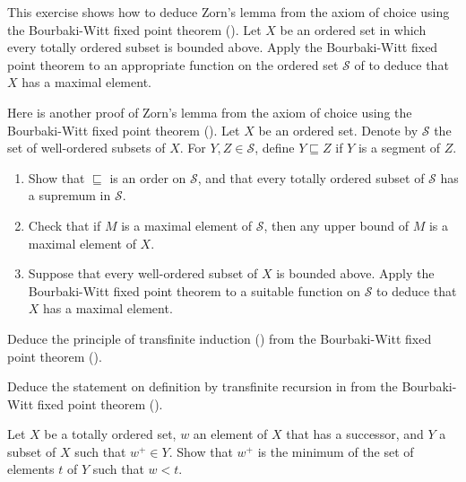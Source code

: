 \documentclass{article}
\begin{document}
\begin{exercise}
  \label{exe:h4ww3mr2}
  This exercise shows how to deduce Zorn's lemma from the axiom of
  choice using the Bourbaki-Witt fixed point theorem
  ().  Let \(X\) be an ordered set in which every
  totally ordered subset is bounded above.  Apply the Bourbaki-Witt
  fixed point theorem to an appropriate function on the ordered set
  \(\mathcal{S}\) of  to deduce that \(X\) has a
  maximal element.
\end{exercise}

\begin{exercise}
  \label{exe:51daga9q}
  Here is another proof of Zorn's lemma from the axiom of choice using
  the Bourbaki-Witt fixed point theorem ().  Let
  \(X\) be an ordered set.  Denote by \(\mathcal{S}\) the set of
  well-ordered subsets of \(X\).  For \(Y, Z \in \mathcal{S}\), define
  \(Y \sqsubseteq Z\) if \(Y\) is a segment of \(Z\).
  \begin{enumerate}
  \item \label{item:j6hjwyxg} Show that \(\sqsubseteq\) is an order on
    \(\mathcal{S}\), and that every totally ordered subset of
    \(\mathcal{S}\) has a supremum in \(\mathcal{S}\).
  \item \label{item:41f56yw7} Check that if \(M\) is a maximal element
    of \(\mathcal{S}\), then any upper bound of \(M\) is a maximal
    element of \(X\).
  \item Suppose that every well-ordered subset of \(X\) is bounded
    above.  Apply the Bourbaki-Witt fixed point theorem to a suitable
    function on \(\mathcal{S}\) to deduce that \(X\) has a maximal
    element.
  \end{enumerate}
\end{exercise}

\begin{exercise}
  \label{exe:y5zl49rq}
  Deduce the principle of transfinite induction ()
  from the Bourbaki-Witt fixed point theorem ().
\end{exercise}

\begin{exercise}
  \label{exe:ouafuvlu}
  Deduce the statement on definition by transfinite recursion in
   from the Bourbaki-Witt fixed point theorem
  ().
\end{exercise}

\begin{exercise}
  \label{exe:ylp1zcc8}
  Let \(X\) be a totally ordered set, \(w\) an element of \(X\) that
  has a successor, and \(Y\) a subset of \(X\) such that
  \(w^+ \in Y\).  Show that \(w^+\) is the minimum of the set of
  elements \(t\) of \(Y\) such that \(w < t\).
\end{exercise}
\end{document}
